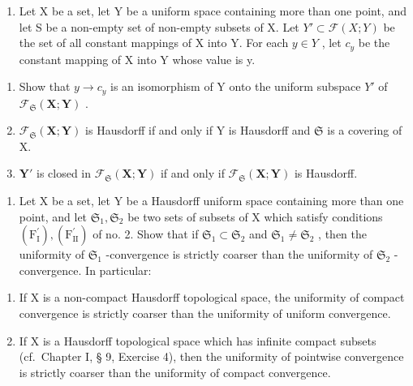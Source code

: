\ExerciseSection

\begin{enumerate}
\def\labelenumi{\arabic{enumi})}
\tightlist
\item
  Let X be a set, let Y be a uniform space containing more than one point, and let S be a non-empty set of non-empty subsets of X. Let \(Y' \subset \mathcal{F}(X; Y)\) be the set of all constant mappings of X into Y. For each \(y \in Y\) , let \(c_{y}\) be the constant mapping of X into Y whose value is y.
\end{enumerate}

\begin{enumerate}
\def\labelenumi{\alph{enumi})}
\item
  Show that \(y \to c_{y}\) is an isomorphism of Y onto the uniform subspace \(Y'\) of \(\mathcal{F}_{\mathfrak{S}}(\mathbf{X}; \mathbf{Y})\) .
\item
  \(\mathcal{F}_{\mathfrak{S}}(\mathbf{X};\mathbf{Y})\) is Hausdorff if and only if Y is Hausdorff and \(\mathfrak{S}\) is a covering of X.
\item
  \(\mathbf{Y}'\) is closed in \(\mathcal{F}_{\mathfrak{S}}(\mathbf{X};\mathbf{Y})\) if and only if \(\mathcal{F}_{\mathfrak{S}}(\mathbf{X};\mathbf{Y})\) is Hausdorff.
\end{enumerate}

\begin{enumerate}
\def\labelenumi{\arabic{enumi})}
\setcounter{enumi}{1}
\tightlist
\item
  Let X be a set, let Y be a Hausdorff uniform space containing more than one point, and let \(\mathfrak{S}_1, \mathfrak{S}_2\) be two sets of subsets of X which satisfy conditions \((\mathrm{F}_{\mathrm{I}}^{\prime}), (\mathrm{F}_{\mathrm{II}}^{\prime})\) of no. 2. Show that if \(\mathfrak{S}_1 \subset \mathfrak{S}_2\) and \(\mathfrak{S}_1 \neq \mathfrak{S}_2\) , then the uniformity of \(\mathfrak{S}_1\) -convergence is strictly coarser than the uniformity of \(\mathfrak{S}_2\) -convergence. In particular:
\end{enumerate}

\begin{enumerate}
\def\labelenumi{(\roman{enumi})}
\item
  If X is a non-compact Hausdorff topological space, the uniformity of compact convergence is strictly coarser than the uniformity of uniform convergence.
\item
  If X is a Hausdorff topological space which has infinite compact subsets (cf.~Chapter I, § 9, Exercise 4), then the uniformity of pointwise convergence is strictly coarser than the uniformity of compact convergence.
\end{enumerate}


